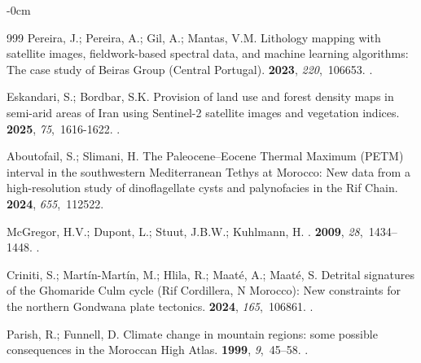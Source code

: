 \documentclass[geomatics,article,accept,pdftex,oneauthor]{Definitions/mdpi}
\begin{document}
\begin{adjustwidth}{-\extralength}{0cm}
\begin{thebibliography}{999}
Pereira, J.; Pereira, A.; Gil, A.; Mantas, V.M.
\newblock Lithology mapping with satellite images, fieldwork-based spectral
  data, and machine learning algorithms: The case study of Beiras Group
  (Central Portugal).
 {\bf 2023}, {\em 220},~106653.
.

Eskandari, S.; Bordbar, S.K.
\newblock Provision of land use and forest density maps in semi-arid areas of
  Iran using Sentinel-2 satellite images and vegetation indices.
 {\bf 2025}, {\em 75},~1616-1622.
.

Aboutofail, S.; Slimani, H.
\newblock The Paleocene--Eocene Thermal Maximum (PETM) interval in the
  southwestern Mediterranean Tethys at Morocco: New data from a high-resolution
  study of dinoflagellate cysts and palynofacies in the Rif Chain.
 {\bf 2024},
  {\em 655},~112522.

McGregor, H.V.; Dupont, L.; Stuut, J.B.W.; Kuhlmann, H.
.
 {\bf 2009}, {\em 28},~1434--1448.
.

Criniti, S.; Martín-Martín, M.; Hlila, R.; Maaté, A.; Maaté, S.
\newblock Detrital signatures of the Ghomaride Culm cycle (Rif Cordillera, N
  Morocco): New constraints for the northern Gondwana plate tectonics.
 {\bf 2024}, {\em 165},~106861.
.

Parish, R.; Funnell, D.
\newblock Climate change in mountain regions: some possible consequences in the
  Moroccan High Atlas.
 {\bf 1999}, {\em 9},~45--58.
.


\end{thebibliography}
\end{adjustwidth}
\end{document}
